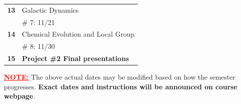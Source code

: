 \documentclass[11pt, a4paper]{article}
\newcommand{\assignments}{\bluetext{\textbf{Assignment:}}}
\begin{document}
\begin{tabular}{|p{1cm}|p{15cm}|}
 \textbf{13} & Galactic Dynamics\\
    & \assignments \# 7: 11/21\\

\hline 
\textbf{14} &  Chemical Evolution and Local Group\\
& \assignments \# 8: 11/30\\
\hline  
\textbf{15} &  \textbf{Project \#2 Final presentations}\\

\hline  
\end{tabular}   

\vspace{1cm}
\noindent \textcolor{red}{\textbf{\underline{NOTE:}}} The above actual dates may
be modified based on how the semester progresses. \textbf{Exact dates and
instructions will be announced on course webpage}. 
\end{document}
